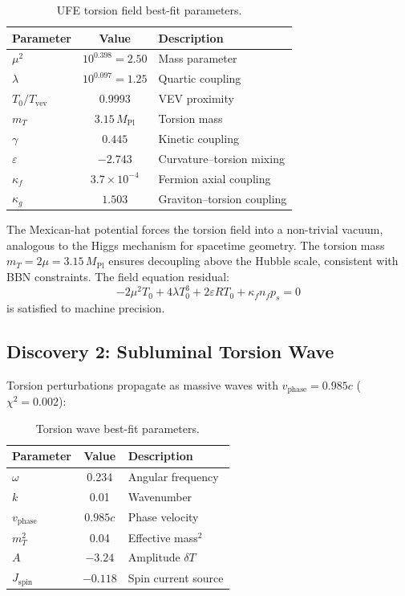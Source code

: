 \documentclass[twocolumn,prd,superscriptaddress,nofootinbib]{revtex4-2}
\begin{document}
\begin{table}[h]
\caption{UFE torsion field best-fit parameters.}
\label{tab:ufe_params}
\begin{ruledtabular}
\begin{tabular}{lcl}
Parameter & Value & Description \\
\hline
$\mu^2$ & $10^{0.398} = 2.50$ & Mass parameter \\
$\lambda$ & $10^{0.097} = 1.25$ & Quartic coupling \\
$T_0/T_\text{vev}$ & $0.9993$ & VEV proximity \\
$m_T$ & $3.15\, M_\text{Pl}$ & Torsion mass \\
$\gamma$ & $0.445$ & Kinetic coupling \\
$\varepsilon$ & $-2.743$ & Curvature--torsion mixing \\
$\kappa_f$ & $3.7 \times 10^{-4}$ & Fermion axial coupling \\
$\kappa_g$ & $1.503$ & Graviton--torsion coupling \\
\end{tabular}
\end{ruledtabular}
\end{table}

The Mexican-hat potential forces the torsion field into a non-trivial vacuum, analogous to the Higgs mechanism for spacetime geometry. The torsion mass $m_T = 2\mu = 3.15\, M_\text{Pl}$ ensures decoupling above the Hubble scale, consistent with BBN constraints. The field equation residual:
\begin{equation}
-2\mu^2 T_0 + 4\lambda T_0^3 + 2\varepsilon R T_0 + \kappa_f n_f p_s = 0
\end{equation}
is satisfied to machine precision.

\subsection{Discovery 2: Subluminal Torsion Wave}

Torsion perturbations propagate as massive waves with $v_\text{phase} = 0.985c$ ($\chi^2 = 0.002$):

\begin{table}[h]
\caption{Torsion wave best-fit parameters.}
\label{tab:wave_params}
\begin{ruledtabular}
\begin{tabular}{lcl}
Parameter & Value & Description \\
\hline
$\omega$ & 0.234 & Angular frequency \\
$k$ & 0.01 & Wavenumber \\
$v_\text{phase}$ & $0.985c$ & Phase velocity \\
$m_T^2$ & 0.04 & Effective mass$^2$ \\
$A$ & $-3.24$ & Amplitude $\delta T$ \\
$J_\text{spin}$ & $-0.118$ & Spin current source \\
\end{tabular}
\end{ruledtabular}
\end{table}
\end{document}
